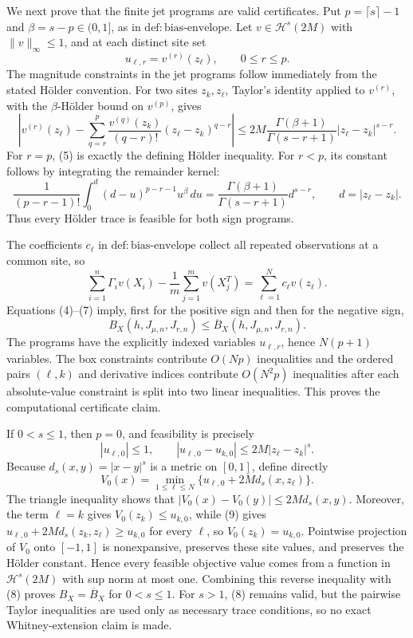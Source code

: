 We next prove that the finite jet programs are valid certificates. Put \(p=\lceil s\rceil-1\) and \(\beta=s-p\in(0,1]\), as in \(\mathrm{def:bias\text{-}envelope}\). Let \(v\in\mathcal H^s(2M)\) with \(\|v\|_\infty\le1\), and at each distinct site set
\[
u_{\ell,r}=v^{(r)}(z_\ell),\qquad 0\le r\le p.
\tag{4}
\]
The magnitude constraints in the jet programs follow immediately from the stated H\"older convention. For two sites \(z_k,z_\ell\), Taylor's identity applied to \(v^{(r)}\), with the \(\beta\)-H\"older bound on \(v^{(p)}\), gives
\[
\left|v^{(r)}(z_\ell)-\sum_{q=r}^p
\frac{v^{(q)}(z_k)}{(q-r)!}(z_\ell-z_k)^{q-r}\right|
\le 2M\frac{\Gamma(\beta+1)}{\Gamma(s-r+1)}
|z_\ell-z_k|^{s-r}.
\tag{5}
\]
For \(r=p\), (5) is exactly the defining H\"older inequality. For \(r<p\), its constant follows by integrating the remainder kernel:
\[
\frac1{(p-r-1)!}\int_0^d(d-u)^{p-r-1}u^\beta\,du
=\frac{\Gamma(\beta+1)}{\Gamma(s-r+1)}d^{s-r},
\qquad d=|z_\ell-z_k|.
\tag{6}
\]
Thus every H\"older trace is feasible for both sign programs.

The coefficients \(c_\ell\) in \(\mathrm{def:bias\text{-}envelope}\) collect all repeated observations at a common site, so
\[
\sum_{i=1}^n\Gamma_i v(X_i)-\frac1m\sum_{j=1}^m v(X_j^T)
=\sum_{\ell=1}^N c_\ell v(z_\ell).
\tag{7}
\]
Equations (4)--(7) imply, first for the positive sign and then for the negative sign,
\[
B_X(h,J_{\mu,n},J_{r,n})\le
\overline B_X(h,J_{\mu,n},J_{r,n}).
\tag{8}
\]
The programs have the explicitly indexed variables \(u_{\ell,r}\), hence \(N(p+1)\) variables. The box constraints contribute \(O(Np)\) inequalities and the ordered pairs \((\ell,k)\) and derivative indices contribute \(O(N^2p)\) inequalities after each absolute-value constraint is split into two linear inequalities. This proves the computational certificate claim.

If \(0<s\le1\), then \(p=0\), and feasibility is precisely
\[
|u_{\ell,0}|\le1,
\qquad |u_{\ell,0}-u_{k,0}|\le2M|z_\ell-z_k|^s.
\tag{9}
\]
Because \(d_s(x,y)=|x-y|^s\) is a metric on \([0,1]\), define directly
\[
V_0(x)=\min_{1\le\ell\le N}\{u_{\ell,0}+2M d_s(x,z_\ell)\}.
\tag{10}
\]
The triangle inequality shows that \(|V_0(x)-V_0(y)|\le2M d_s(x,y)\). Moreover, the term \(\ell=k\) gives \(V_0(z_k)\le u_{k,0}\), while (9) gives \(u_{\ell,0}+2M d_s(z_k,z_\ell)\ge u_{k,0}\) for every \(\ell\), so \(V_0(z_k)=u_{k,0}\). Pointwise projection of \(V_0\) onto \([-1,1]\) is nonexpansive, preserves these site values, and preserves the H\"older constant. Hence every feasible objective value comes from a function in \(\mathcal H^s(2M)\) with sup norm at most one. Combining this reverse inequality with (8) proves \(B_X=\overline B_X\) for \(0<s\le1\). For \(s>1\), (8) remains valid, but the pairwise Taylor inequalities are used only as necessary trace conditions, so no exact Whitney-extension claim is made.

